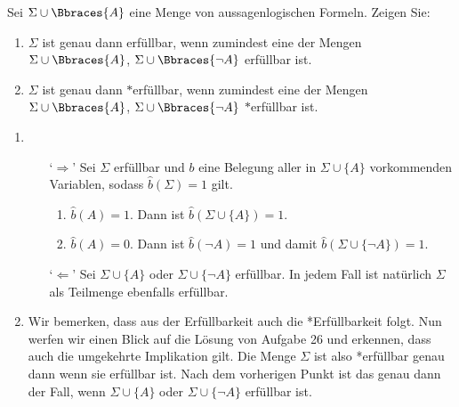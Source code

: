 
\begin{exercise}[25]

Sei $\Sigma \cup \Bbraces{A}$ eine Menge von aussagenlogischen Formeln.
Zeigen Sie:

\begin{enumerate}
    \item $\Sigma$ ist genau dann erfüllbar, wenn zumindest eine der Mengen $\Sigma \cup \Bbraces{A}$, $\Sigma \cup \Bbraces{\neg A}$ erfüllbar ist.
    \item $\Sigma$ ist genau dann $\ast$erfüllbar, wenn zumindest eine der Mengen $\Sigma \cup \Bbraces{A}$, $\Sigma \cup \Bbraces{\neg A}$ $\ast$erfüllbar ist.
\end{enumerate}

\end{exercise}


\begin{solution}
\phantom{}
\begin{enumerate}
	\item 
	\begin{enumerate}
		\item[`$\Rightarrow$']  Sei $\Sigma$ erfüllbar und $b$ eine Belegung aller in $\Sigma \cup \{A\}$ vorkommenden Variablen, sodass $\hat{b}(\Sigma) = 1$ gilt. 
		\begin{enumerate}[label = Fall \arabic*:]
			\item $\hat{b}(A) = 1$. Dann ist $\hat{b}(\Sigma \cup \{A\}) =1$.
			\item $\hat{b}(A) = 0$. Dann ist $\hat{b}(\neg A) = 1$ und damit $\hat{b}(\Sigma \cup \{\neg A\}) =1$.
		\end{enumerate}
		\item[`$\Leftarrow$'] Sei $\Sigma \cup \{A\}$ oder $\Sigma \cup \{\neg A\}$ erfüllbar. In jedem Fall ist natürlich $\Sigma$ als Teilmenge ebenfalls erfüllbar.
	\end{enumerate}
	\item Wir bemerken, dass aus der Erfüllbarkeit auch die *Erfüllbarkeit folgt. Nun werfen wir einen Blick auf die Lösung von Aufgabe 26 und erkennen, dass auch die umgekehrte Implikation gilt. Die Menge $\Sigma$ ist also *erfüllbar genau dann wenn sie erfüllbar ist. Nach dem vorherigen Punkt ist das genau dann der Fall, wenn $\Sigma \cup \{A\}$ oder $\Sigma \cup \{\neg A\}$ erfüllbar ist.
\end{enumerate}

\end{solution}

